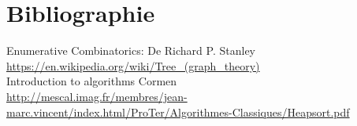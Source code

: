 \documentclass{report}
\begin{document}
\section{Bibliographie}


Enumerative Combinatorics: De Richard P. Stanley \\
\url{https://en.wikipedia.org/wiki/Tree_(graph_theory)}\\
Introduction to algorithms Cormen\\
\url{http://mescal.imag.fr/membres/jean-marc.vincent/index.html/ProTer/Algorithmes-Classiques/Heapsort.pdf}\\

\listoffigures
\end{document}
